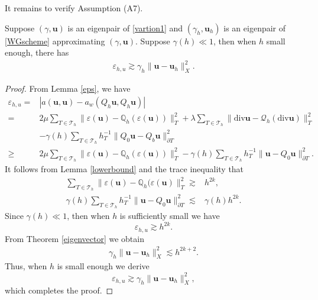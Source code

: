 \documentclass[leqno,CJK]{siamltex704}
\numberwithin{equation}{section}
\def\Q{{\mathcal{Q}}}
\def\dQ{{\mathbb{Q}}}
\def\sumT{\sum_{T\in\mathcal{T}_h}}     %
\def\bu{{\mathbf{u}}}
\newcommand{\eps}{\varepsilon}
\newcommand{\di}{\text{div}}
\begin{document}
It remains to verify Assumption (A7).
\begin{lemma}\label{A72}
	Suppose $(\gamma,\bu)$ is an eigenpair of \eqref{vartion1} and $(\gamma_h,\bu_h)$ is an eigenpair of
	\eqref{WGscheme} approximating $(\gamma,\bu)$. Suppose $\gamma(h)\ll 1$, then when $h$ small enough, there has
	\begin{eqnarray*}
		\varepsilon_{h,u} \gtrsim \gamma_h\|\bu-\bu_h\|_X^2.
	\end{eqnarray*}
\end{lemma}
\begin{proof}
	From Lemma \ref{eps}, we have
	\begin{align*}
		\varepsilon_{h,u} =& |a(\bu,\bu)-a_w(Q_h\bu,Q_h\bu)|
		\\
		=& 2\mu\sumT\|\eps(\bu)-\dQ_h(\eps(\bu))\|_T^2+\lambda\sumT\|\di \bu-\Q_h(\di\bu)\|_T^2 \\
		\quad&-\gamma(h)\sumT h_T^{-1}\|Q_0\bu-Q_b\bu\|_{\partial T}^2\\
		\ge& 2\mu\sumT\|\eps(\bu)-\dQ_h(\eps(\bu))\|_T^2 
		-\gamma(h)\sumT h_T^{-1}\|\bu-Q_0\bu\|_{\partial T}^2.
	\end{align*}
	It follows from Lemma \ref{lowerbound} and the trace inequality that
	\begin{align*}
		\sumT\|\eps(\bu)-\dQ_h(\eps(\bu)\|_T^2 \gtrsim& h^{2k},
		\\
		\gamma(h)\sumT h_T^{-1}\|\bu-Q_0\bu\|_{\partial T}^2 \lesssim& \gamma(h)h^{2k}.
	\end{align*}
	Since $\gamma(h)\ll 1$, then when $h$ is sufficiently small we have
	\[
	\varepsilon_{h,u} \gtrsim h^{2k}.
	\]
	From Theorem \ref{eigenvector} we obtain
	\begin{eqnarray*}
		\gamma_h\|\bu-\bu_h\|_X^2\lesssim h^{2k+2}.
	\end{eqnarray*}
	Thus, when $h$ is small enough we derive
	\[
	\varepsilon_{h,u} \gtrsim \gamma_h\|\bu-\bu_h\|_X^2,
	\]
	which completes the proof.
\end{proof}
\end{document}
